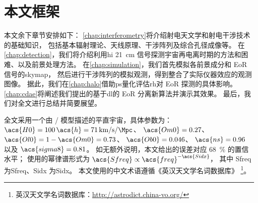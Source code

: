 \section{本文框架}
\label{sec:structure}

本文余下章节安排如下：
\autoref{chap:interferometry}将介绍射电天文学和射电干涉技术的基础知识，
包括基本辐射理论、天线原理、干涉阵列及综合孔径成像等。
在\autoref{chap:detection}，我们将介绍利用\acl{hi} \SI{21}{\cm}
信号探测宇宙再电离时期的方法和困难、以及前景处理方法。
在\autoref{chap:simulation}，我们首先模拟各前景成分和 EoR 信号的\acl{skymap}，
然后进行干涉阵列的模拟观测，得到整合了实际仪器效应的观测图像。
据此，我们在\autoref{chap:halo}借助\acl{ps}量化评估\acl{rh}对
EoR 探测的具体影响。
\autoref{chap:cdae}将阐述我们提出的基于\acl{dl}的 EoR 分离新算法并演示其效果。
最后，我们对全文进行总结并简要展望。

全文采用一个由 \lcdm/ 模型描述的平直宇宙，具体参数为：
$\acs{H0} = 100\,\acs{h} = \SI{71}{\km\per\second\per\Mpc}$、
$\acs{Om0} = 0.27$、
$\acs{Ol0} = 1 - \acs{Om0} = 0.73$、
$\acs{Ob0} = 0.046$、
$\acs{ns} = 0.96$ 以及 $\acs{sigma8} = 0.81$。
如无额外说明，本文给出的误差对应 \SI{68}{\percent} 的置信水平；
使用的幂律谱形式为 $\acs{Sfreq} \propto \acs{freq}^{-\acs{Sidx}}$，
其中 \acs{Sfreq} 为\acl{Sfreq}、\acs{Sidx} 为\acl{Sidx}。
本文使用的中文术语遵循《英汉天文学名词数据库》
\footnote{英汉天文学名词数据库：\url{http://astrodict.china-vo.org/}}。


